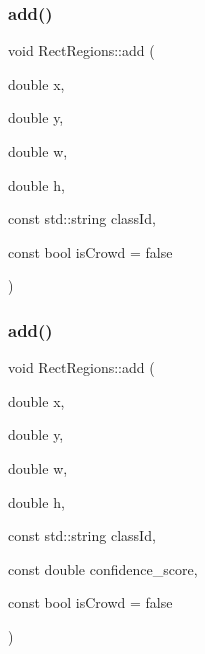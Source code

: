 \mbox{\label{struct_rect_regions_a988c804d33f2b8fc9dabe79c3259b267}} 
\subsubsection{\texorpdfstring{add()}{add()}\hspace{0.1cm}{\footnotesize\ttfamily [4/5]}}
{\footnotesize\ttfamily void Rect\+Regions\+::add (\begin{DoxyParamCaption}\item[{double}]{x,  }\item[{double}]{y,  }\item[{double}]{w,  }\item[{double}]{h,  }\item[{const std\+::string}]{class\+Id,  }\item[{const bool}]{is\+Crowd = {\ttfamily false} }\end{DoxyParamCaption})}

\mbox{\label{struct_rect_regions_a009ff3de6ffc9c05e0cd3c87916d16be}} 
\subsubsection{\texorpdfstring{add()}{add()}\hspace{0.1cm}{\footnotesize\ttfamily [5/5]}}
{\footnotesize\ttfamily void Rect\+Regions\+::add (\begin{DoxyParamCaption}\item[{double}]{x,  }\item[{double}]{y,  }\item[{double}]{w,  }\item[{double}]{h,  }\item[{const std\+::string}]{class\+Id,  }\item[{const double}]{confidence\+\_\+score,  }\item[{const bool}]{is\+Crowd = {\ttfamily false} }\end{DoxyParamCaption})}

\mbox{\label{struct_rect_regions_a9f31dc6fd3d371417e2c9024d1fdeecb}} 
